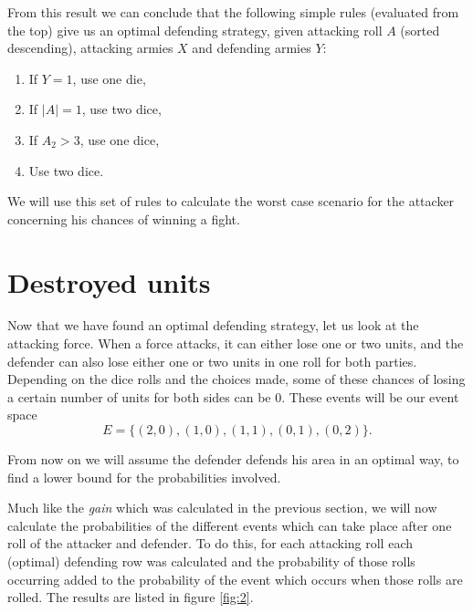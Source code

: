 \documentclass{amsart}
\begin{document}
	From this result we can conclude that the following simple rules (evaluated from the top) give us an optimal defending strategy, given attacking roll $A$ (sorted descending), attacking armies $X$ and defending armies $Y$:
	\begin{enumerate}
		\item If $Y = 1$, use one die,
		\item If $|A| = 1$, use two dice,
		\item If $A_2 > 3$, use one dice,
		\item Use two dice.
	\end{enumerate}
	
	We will use this set of rules to calculate the worst case scenario for the attacker concerning his chances of winning a fight. 
	
	\section{Destroyed units}
	
	Now that we have found an optimal defending strategy, let us look at the attacking force. When a force attacks, it can either lose one or two units, and the defender can also lose either one or two units in one roll for both parties. Depending on the dice rolls and the choices made, some of these chances of losing a certain number of units for both sides can be $0$. These events will be our event space 
	$$
	E = \{(2,0), (1,0), (1,1), (0,1), (0,2)\}.
	$$
	
	From now on we will assume the defender defends his area in an optimal way, to find a lower bound for the probabilities involved. 
	
	Much like the \emph{gain} which was calculated in the previous section, we will now calculate the probabilities of the different events which can take place after one roll of the attacker and defender. To do this, for each attacking roll each (optimal) defending row was calculated and the probability of those rolls occurring added to the probability of the event which occurs when those rolls are rolled. The results are listed in figure \ref{fig:2}. 
	
\end{document}

